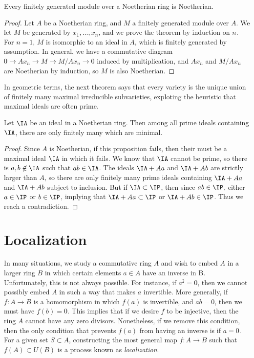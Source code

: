\begin{theorem}
    Every finitely generated module over a Noetherian ring is Noetherian.
\end{theorem}
\begin{proof}
    Let $A$ be a Noetherian ring, and $M$ a finitely generated module over $A$. We let $M$ be generated by $x_1, \dots, x_n$, and we prove the theorem by induction on $n$. For $n = 1$, $M$ is isomorphic to an ideal in $A$, which is finitely generated by assumption. In general, we have a commutative diagram $0 \to Ax_n \to M \to M/Ax_n \to 0$ induced by multiplication, and $Ax_n$ and $M/Ax_n$ are Noetherian by induction, so $M$ is also Noetherian.
\end{proof}

In geometric terms, the next theorem says that every variety is the unique union of finitely many maximal irreducible subvarieties, exploting the heuristic that maximal ideals are often prime.

\begin{theorem}
    Let $\IA$ be an ideal in a Noetherian ring. Then among all prime ideals containing $\IA$, there are only finitely many which are minimal.
\end{theorem}
\begin{proof}
    Since $A$ is Noetherian, if this proposition fails, then their must be a maximal ideal $\IA$ in which it fails. We know that $\IA$ cannot be prime, so there is $a,b \not \in \IA$ such that $ab \in \IA$. The ideals $\IA + Aa$ and $\IA + Ab$ are strictly larger than $A$, so there are only finitely many prime ideals containing $\IA + Aa$ and $\IA + Ab$ subject to inclusion. But if $\IA \subset \IP$, then since $ab \in \IP$, either $a \in \IP$ or $b \in \IP$, implying that $\IA + Aa \subset \IP$ or $\IA + Ab \in \IP$. Thus we reach a contradiction.
\end{proof}

\chapter{Localization}

In many situations, we study a commutative ring $A$ and wish to embed $A$ in a larger ring $B$ in which certain elements $a \in A$ have an inverse in B. Unfortunately, this is not always possible. For instance, if $a^2 = 0$, then we cannot possibly embed $A$ in such a way that makes $a$ invertible. More generally, if $f:A \to B$ is a homomorphism in which $f(a)$ is invertible, and $ab = 0$, then we must have $f(b) = 0$. This implies that if we desire $f$ to be injective, then the ring $A$ cannot have any zero divisors. Nonetheless, if we remove this condition, then the only condition that prevents $f(a)$ from having an inverse is if $a = 0$. For a given set $S \subset A$, constructing the most general map $f: A \to B$ such that $f(A) \subset U(B)$ is a process known as \emph{localization}.

